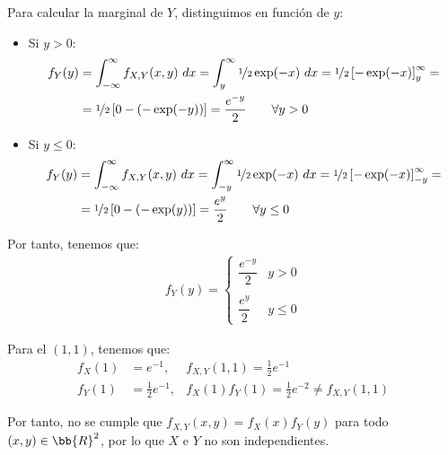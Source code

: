 \begin{ejercicio}
    Para calcular la marginal de $Y$, distinguimos en función de $y$:
    \begin{itemize}
        \item Si $y>0$:
        \begin{align*}
            f_Y(y) &= \int_{-\infty}^{\infty} f_{X,Y}(x, y) \ dx
            = \int_{y}^{\infty} \nicefrac{1}{2}\exp(-x) \ dx
            = \nicefrac{1}{2}\left[-\exp(-x)\right]_{y}^{\infty}
            =\\&= \nicefrac{1}{2}\left[0 - (-\exp(-y))\right]
            = \frac{e^{-y}}{2} \qquad \forall y>0
        \end{align*}

        \item Si $y\leq 0$:
        \begin{align*}
            f_Y(y) &= \int_{-\infty}^{\infty} f_{X,Y}(x, y) \ dx
            = \int_{-y}^{\infty} \nicefrac{1}{2}\exp(-x) \ dx
            = \nicefrac{1}{2}\left[-\exp(-x)\right]_{-y}^{\infty}
            =\\&= \nicefrac{1}{2}\left[0 - (-\exp(y))\right]
            = \frac{e^{y}}{2} \qquad \forall y\leq 0
        \end{align*}
    \end{itemize}

    Por tanto, tenemos que:
    \begin{align*}
        f_Y(y)=\begin{cases}
            \dfrac{e^{-y}}{2} & y>0\\ \\
            \dfrac{e^{y}}{2} & y\leq 0
        \end{cases}
    \end{align*}

    Para el $(1,1)$, tenemos que:
    \begin{align*}
        f_X(1) &= e^{-1}, & f_{X,Y}(1,1)=\frac{1}{2}e^{-1} \\
        f_Y(1) &= \frac{1}{2}e^{-1} , & f_X(1)f_Y(1)=\frac{1}{2}e^{-2}\neq f_{X,Y}(1,1)
    \end{align*}

    Por tanto, no se cumple que $f_{X,Y}(x,y)=f_X(x)f_Y(y)$ para todo $(x,y)\in\bb{R}^2$, por lo que $X$ e $Y$ no son independientes.
\end{ejercicio}

